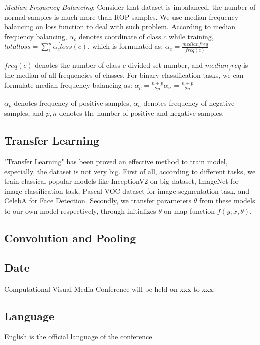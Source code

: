 \documentclass[10pt,twocolumn,letterpaper]{article}
\begin{document}
  \emph{Median Frequency Balancing}: Consider that dataset is imbalanced, the number of normal samples is much more than ROP samples. We use median frequency balancing on loss function to deal with such problem. According to median frequency balancing, ${\alpha}_c$ denotes coordinate of class $c$ while training, \eg $ total loss = \sum_1^{n} {{{\alpha}_c} \dot loss(c)}$, which is formulated as:
  \begin{math}
    {\alpha}_c = \frac{median freq}{freq(c)}
  \end{math}

  $freq(c)$ denotes the number of class $c$ divided set number, and $median_freq$ is the median of all frequencies of classes. For binary classification tasks, we can formulate median frequency balancing as:
  \begin{math}
    {\alpha}_p = \frac{n + p}{2 \dot p}
    {\alpha}_n = \frac{n + p}{2 \dot n}
  \end{math}

  ${\alpha}_p$ denotes frequency of positive samples, ${\alpha}_n$ denotes frequency of negative samples, and $p, n$ denotes the number of positive and negative samples.

\subsection{Transfer Learning}
    "Transfer Learning" has been proved an effective method to train model, especially, the dataset is not very big. First of all, according to different tasks, we train classical popular models like InceptionV2 on big dataset, \eg ImageNet for image classification task, Pascal VOC dataset for image segmentation task, and CelebA for Face Detection. Secondly, we transfer parameters $\theta$ from these models to our own model respectively, through initializes $\theta$ on map function $f(y;x, \theta)$.

\subsection{Convolution and Pooling}


\subsection{Date}
Computational Visual Media Conference will be held on xxx to xxx.

\subsection{Language}
English is the official language of the conference.
\end{document}
